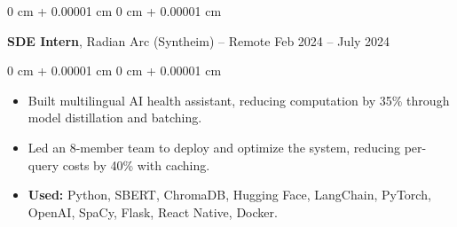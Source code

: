 \documentclass[10pt, letterpaper]{article}
\newenvironment{highlights}{
    \begin{itemize}[
        topsep=0.10 cm,
        parsep=0.10 cm,
        partopsep=0pt,
        itemsep=0pt,
        leftmargin=0 cm + 10pt
    ]
}{
    \end{itemize}
} %
\newenvironment{onecolentry}{
    \begin{adjustwidth}{
        0 cm + 0.00001 cm
    }{
        0 cm + 0.00001 cm
    }
}{
    \end{adjustwidth}
} %
\newenvironment{twocolentry}[2][]{
    \onecolentry
    \def\secondColumn{#2}
    \setcolumnwidth{\fill, 4 cm}
    \begin{paracol}{2}
}{
    \switchcolumn \raggedleft \secondColumn
    \end{paracol}
    \endonecolentry
} %
\begin{document}
        \vspace{0.2 cm}

        \begin{twocolentry}{
            Feb 2024 – July 2024
        }
            \textbf{SDE Intern}, Radian Arc (Syntheim) -- Remote\end{twocolentry}

        \vspace{0.10 cm}
        \begin{onecolentry}
            \begin{highlights}
                \item Built multilingual AI health assistant, reducing computation by 35\% through model distillation and batching.
                \item Led an 8-member team to deploy and optimize the system, reducing per-query costs by 40\% with caching.
                \item \textbf{Used:} Python, SBERT, ChromaDB, Hugging Face, LangChain, PyTorch, OpenAI, SpaCy, Flask, React Native, Docker.
            \end{highlights}
        \end{onecolentry}


    


            

                
\end{document}
